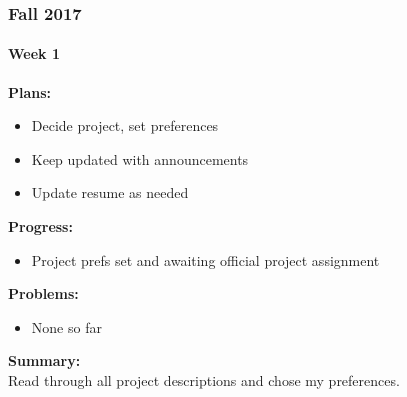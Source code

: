 \subsubsection{Fall 2017}
\paragraph{Week 1}
\begin{adjustwidth}{2.5em}{0pt}
    \vspace{-0.5cm}\textbf{Plans:}
    \vspace{-0.5cm}
    \begin{itemize}
        \item Decide project, set preferences
        \item Keep updated with announcements
        \item Update resume as needed
    \end{itemize} 
    \vspace{-0.3cm}\textbf{Progress:}
    \vspace{-0.5cm}
    \begin{itemize}
        \item Project prefs set and awaiting official project assignment 
    \end{itemize} 
    \vspace{-0.3cm}\textbf{Problems:}
    \vspace{-0.5cm}
    \begin{itemize}
        \item None so far
    \end{itemize}  
    \vspace{-0.3cm}\noindent\textbf{Summary:}\\
    \noindent Read through all project descriptions and chose my preferences.
\end{adjustwidth}
